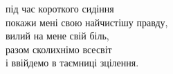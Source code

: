 під час короткого сидіння\\
покажи мені свою найчистішу правду,\\
вилий на мене свій біль,\\
разом сколихнімо всесвіт\\
і ввійдемо в таємниці зцілення.
